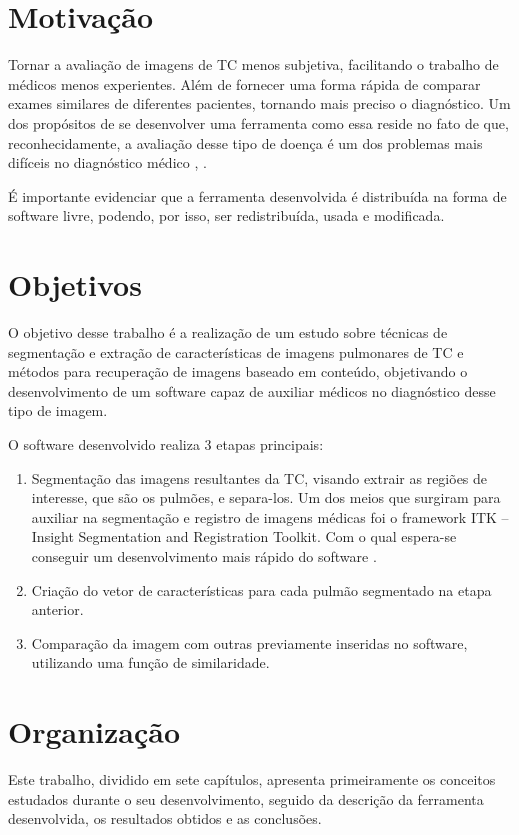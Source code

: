 \section{Motivação}

Tornar a avaliação de imagens de TC menos subjetiva, facilitando o trabalho de médicos menos experientes. Além de fornecer uma forma rápida de comparar exames similares de diferentes pacientes, tornando mais preciso o diagnóstico. Um dos propósitos de se desenvolver uma ferramenta como essa reside no fato de que, reconhecidamente, a avaliação desse tipo de doença é um dos problemas mais difíceis no diagnóstico médico \cite{doi}, \cite{bick}.

É importante evidenciar que a ferramenta desenvolvida é distribuída na forma de software livre, podendo, por isso, ser redistribuída, usada e modificada.

\section{Objetivos}

O objetivo desse trabalho é a realização de um estudo sobre técnicas de segmentação e extração de características de imagens pulmonares de TC e métodos para recuperação de imagens baseado em conteúdo, objetivando o desenvolvimento de um software capaz de auxiliar médicos no diagnóstico desse tipo de imagem.

O software desenvolvido realiza 3 etapas principais:
\begin{enumerate}
 \item Segmentação das imagens resultantes da TC, visando extrair as regiões de interesse, que são os pulmões, e separa-los. Um dos meios que surgiram para auxiliar na segmentação e registro de imagens médicas foi o framework ITK – Insight Segmentation and Registration Toolkit. Com o qual espera-se conseguir um desenvolvimento mais rápido do software \cite{yoo}.
 \item Criação do vetor de características para cada pulmão segmentado na etapa anterior.
 \item Comparação da imagem com outras previamente inseridas no software, utilizando uma função de similaridade.
\end{enumerate}

\section{Organização}

Este trabalho, dividido em sete capítulos, apresenta primeiramente os conceitos estudados durante o seu desenvolvimento, seguido da descrição da ferramenta desenvolvida, os resultados obtidos e as conclusões.

